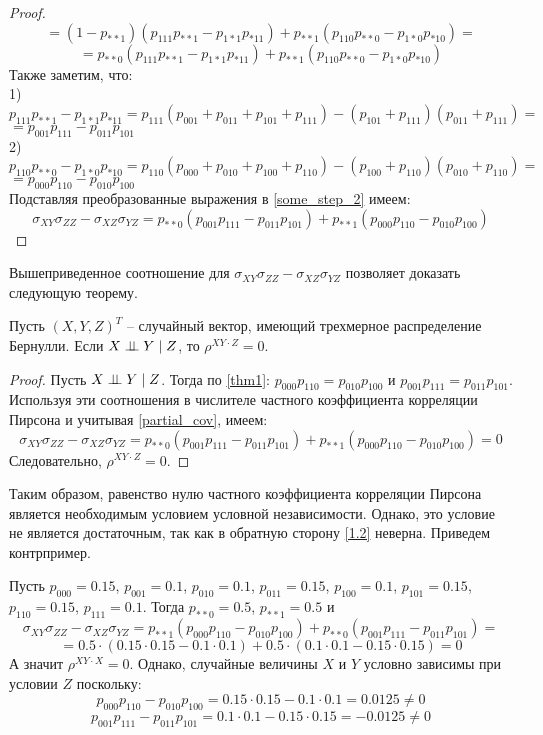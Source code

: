 \begin{proof}
$$    $$
    $$
        =(1-p_{**1})(p_{111}p_{**1}-p_{1*1}p_{*11})+p_{**1}(p_{110}p_{**0}-p_{1*0}p_{*10})=
    $$
    \begin{equation}\label{some_step_2}
        =p_{**0}(p_{111}p_{**1}-p_{1*1}p_{*11})+p_{**1}(p_{110}p_{**0}-p_{1*0}p_{*10})
    \end{equation}
    Также заметим, что:\\
    1) $
        p_{111}p_{**1}-p_{1*1}p_{*11} = p_{111}(p_{001}+p_{011}+p_{101}+p_{111})-
        (p_{101}+p_{111})(p_{011}+p_{111})=
    $
    $
        = p_{001}p_{111}-p_{011}p_{101}
    $
    \\
    2) $
        p_{110}p_{**0}-p_{1*0}p_{*10}=
        p_{110}(p_{000}+p_{010}+p_{100}+p_{110})-(p_{100}+p_{110})(p_{010}+p_{110})=
    $
    $
        =p_{000}p_{110}-p_{010}p_{100}
    $\\
    Подставляя преобразованные выражения в \eqref{some_step_2} имеем:
    $$
    \sigma_{XY} \sigma_{ZZ} - \sigma_{XZ} \sigma_{YZ} = p_{**0}(p_{001}p_{111}-p_{011}p_{101}) + p_{**1} (p_{000}p_{110}-p_{010}p_{100})
    $$
\end{proof}
Вышеприведенное соотношение для $\sigma_{XY} \sigma_{ZZ} - \sigma_{XZ} \sigma_{YZ}$ позволяет доказать следующую теорему.
\begin{theorem}\label{1.2}
    Пусть $(X,Y,Z)^T$ -- случайный вектор, имеющий трехмерное распределение Бернулли.
    Если $X \perp\!\!\!\perp Y \mid Z$, то $\rho^{XY \cdot Z}=0$.
\end{theorem}
\begin{proof}
    Пусть $X \perp\!\!\!\perp Y \mid Z$. Тогда по \autoref{thm1}:
    $p_{000}p_{110}=p_{010}p_{100}$ и 
    $p_{001}p_{111}=p_{011}p_{101}$.
    Используя эти соотношения в числителе частного коэффициента корреляции Пирсона и учитывая \autoref{partial_cov}, имеем:
    $$
    \sigma_{XY} \sigma_{ZZ} - \sigma_{XZ} \sigma_{YZ}=p_{**0}(p_{001}p_{111}-p_{011}p_{101}) + p_{**1} (p_{000}p_{110}-p_{010}p_{100})= 0
    $$
    Следовательно, $\rho^{XY \cdot Z}=0$.
\end{proof}
Таким образом, равенство нулю частного коэффициента корреляции Пирсона является необходимым условием условной независимости.
Однако, это условие не является достаточным, так как в обратную сторону \autoref{1.2} неверна. Приведем контрпример.
\begin{example}
    Пусть $p_{000}=0.15$, $p_{001}=0.1$, $p_{010}=0.1$, $p_{011}=0.15$, $p_{100}=0.1$, $p_{101}=0.15$, $p_{110}=0.15$, $p_{111}=0.1$.
    Тогда $p_{**0}=0.5$, $p_{**1}=0.5$ и
    $$\sigma_{XY} \sigma_{ZZ} - \sigma_{XZ} \sigma_{YZ} = p_{**1}(p_{000}p_{110}-p_{010}p_{100}) + p_{**0}(p_{001}p_{111}-p_{011}p_{101})=$$
    $$=0.5 \cdot (0.15 \cdot 0.15 - 0.1 \cdot 0.1) + 0.5 \cdot (0.1 \cdot 0.1 - 0.15 \cdot 0.15) = 0$$
    А значит $\rho^{XY\cdot X}=0$.
    Однако, случайные величины $X$ и $Y$ условно зависимы при условии $Z$ поскольку:
    $$
        p_{000}p_{110}-p_{010}p_{100}=0.15 \cdot 0.15 - 0.1 \cdot 0.1 = 0.0125 \neq 0
    $$
    $$
        p_{001}p_{111}-p_{011}p_{101}=0.1 \cdot 0.1 - 0.15 \cdot 0.15 = -0.0125 \neq 0
    $$
\end{example}

